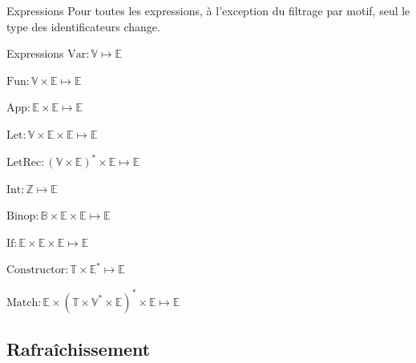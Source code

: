 \documentclass{beamer}
\begin{document}
\begin{frame}{Expressions}
    Pour toutes les expressions, à l'exception du filtrage par motif, seul le type des identificateurs change.%
    
    \begin{block}{Expressions}
        $\text{Var} : \mathbb{V} \mapsto \mathbb{E}$%

        $\text{Fun} : \mathbb{V} \times \mathbb{E} \mapsto \mathbb{E}$%

        $\text{App} : \mathbb{E} \times \mathbb{E} \mapsto \mathbb{E}$%

        $\text{Let} : \mathbb{V} \times \mathbb{E} \times \mathbb{E} \mapsto \mathbb{E}$%

        $\text{LetRec} : (\mathbb{V} \times \mathbb{E})^{*} \times \mathbb{E} \mapsto \mathbb{E}$%

        $\text{Int} : \mathbb{Z} \mapsto \mathbb{E}$%

        $\text{Binop} : \mathbb{B} \times \mathbb{E} \times \mathbb{E} \mapsto \mathbb{E}$%

        $\text{If} : \mathbb{E} \times \mathbb{E} \times \mathbb{E} \mapsto \mathbb{E}$%

        $\text{Constructor} : \mathbb{T} \times \mathbb{E}^{*} \mapsto \mathbb{E}$%

        $\text{Match} : \mathbb{E} \times (\mathbb{T} \times \mathbb{V}^{*} \times \mathbb{E})^{*} \times \mathbb{E} \mapsto \mathbb{E}$%
    \end{block}
\end{frame}

\subsection{Rafraîchissement}
\end{document}

